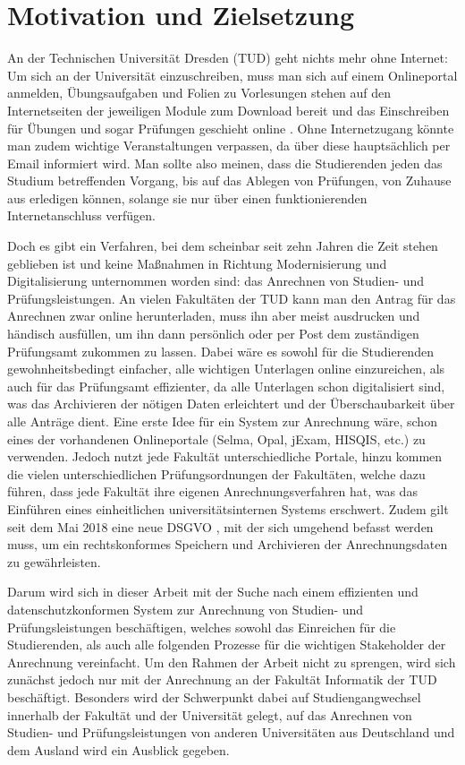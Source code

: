 \chapter{ Motivation und Zielsetzung}

An der Technischen Universität Dresden (TUD) geht nichts mehr ohne Internet: Um sich an der Universität einzuschreiben, muss man sich auf einem Onlineportal anmelden, Übungsaufgaben und Folien zu Vorlesungen stehen auf den Internetseiten der jeweiligen Module zum Download bereit und das Einschreiben für Übungen und sogar Prüfungen geschieht online \parencite{bewerbung}. Ohne Internetzugang könnte man zudem wichtige Veranstaltungen verpassen, da über diese hauptsächlich per Email informiert wird. Man sollte also meinen, dass die Studierenden jeden das Studium betreffenden Vorgang, bis auf das Ablegen von Prüfungen, von Zuhause aus erledigen können, solange sie nur über einen funktionierenden Internetanschluss verfügen.

Doch es gibt ein Verfahren, bei dem scheinbar seit zehn Jahren die Zeit stehen geblieben ist und keine Maßnahmen in Richtung Modernisierung und Digitalisierung unternommen worden sind: das Anrechnen von Studien- und Prüfungsleistungen. An vielen Fakultäten der TUD kann man den Antrag für das Anrechnen zwar online herunterladen, muss ihn aber meist ausdrucken und händisch ausfüllen, um ihn dann persönlich oder per Post dem zuständigen Prüfungsamt zukommen zu lassen. Dabei wäre es sowohl für die Studierenden gewohnheitsbedingt einfacher, alle wichtigen Unterlagen online einzureichen, als auch für das Prüfungsamt effizienter, da alle Unterlagen schon digitalisiert sind, was das Archivieren der nötigen Daten erleichtert und der Überschaubarkeit über alle Anträge dient. Eine erste Idee für ein System zur Anrechnung wäre, schon eines der vorhandenen Onlineportale (Selma, Opal, jExam, HISQIS, etc.) zu verwenden. Jedoch nutzt jede Fakultät unterschiedliche Portale, hinzu kommen die vielen unterschiedlichen Prüfungsordnungen der Fakultäten, welche dazu führen, dass jede Fakultät ihre eigenen Anrechnungsverfahren hat, was das Einführen eines einheitlichen universitätsinternen Systems erschwert.
Zudem gilt seit dem Mai 2018 eine neue DSGVO \parencite{dsgvo}, mit der sich umgehend befasst werden muss, um ein rechtskonformes Speichern und Archivieren der Anrechnungsdaten zu gewährleisten.

Darum wird sich in dieser Arbeit mit der Suche nach einem effizienten und datenschutzkonformen System zur Anrechnung von Studien- und Prüfungsleistungen beschäftigen, welches sowohl das Einreichen für die Studierenden, als auch alle folgenden Prozesse für die wichtigen Stakeholder der Anrechnung vereinfacht. Um den Rahmen der Arbeit nicht zu sprengen, wird sich zunächst jedoch nur mit der Anrechnung an der Fakultät Informatik der TUD beschäftigt. Besonders wird der Schwerpunkt dabei auf Studiengangwechsel innerhalb der Fakultät und der Universität gelegt, auf das Anrechnen von Studien- und Prüfungsleistungen von anderen Universitäten aus Deutschland und dem Ausland wird ein Ausblick gegeben.

